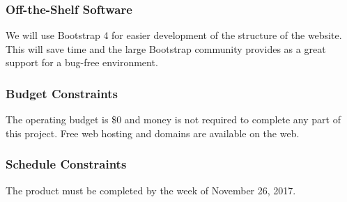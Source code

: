 \documentclass[12pt, titlepage]{article}
\begin{document}
\subsubsection{Off-the-Shelf Software}
We will use Bootstrap 4 for easier development of the structure of the website. This will save time and the large Bootstrap community provides as a great support for a bug-free environment.
\subsubsection{Budget Constraints}
The operating budget is \$0 and money is not required to complete any part of this project. Free web hosting and domains are available on the web.
\subsubsection{Schedule Constraints}
\color{red}The product must be completed by the week of November 26, 2017.\color{black}
\end{document}
